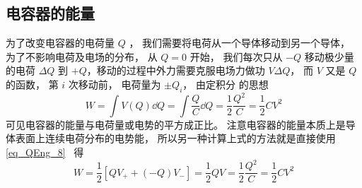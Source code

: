 \subsection{电容器的能量}
为了改变电容器的电荷量 $Q$ ， 我们需要将电荷从一个导体移动到另一个导体， 为了不影响电荷及电场的分布， 从 $Q = 0$ 开始， 我们每次只从 $-Q$ 移动极少量的电荷 $\Delta Q$ 到 $+Q$，移动的过程中外力需要克服电场力做功 $V\Delta Q$， 而 $V$ 又是 $Q$ 的函数， 第 $i$ 次移动前， 电荷量为 $\pm Q_i$， 由定积分 的思想
\begin{equation}
W = \int V(Q) \dd{Q} = \int \frac{Q}{C} \dd{Q} = \frac12 \frac{Q^2}{C} = \frac12 CV^2
\end{equation}
可见电容器的能量与电荷量或电势的平方成正比。 注意电容器的能量本质上是导体表面上连续电荷分布的电势能， 所以另一种计算上式的方法就是直接使用\autoref{eq_QEng_8}~ 得
\begin{equation}
W = \frac12 [QV_+ + (-Q)V_-] = \frac12 QV = \frac12 \frac{Q^2}{C} = \frac12 CV^2 
\end{equation}
